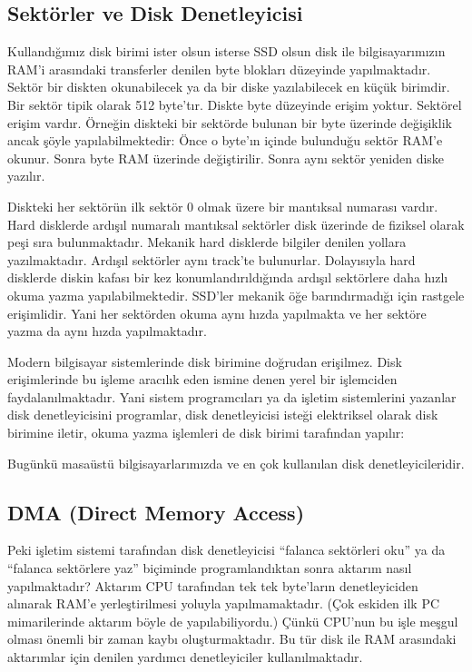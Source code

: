 \documentclass[a4paper,10pt,turkish]{sphinxmanual}
\begin{document}
\subsection{Sektörler ve Disk Denetleyicisi}
\label{\detokenize{filesystem1:sektorler-ve-disk-denetleyicisi}}
\sphinxAtStartPar
Kullandığımız disk birimi ister  olsun isterse SSD olsun disk ile bilgisayarımızın
RAM’i arasındaki transferler  denilen byte blokları düzeyinde yapılmaktadır. Sektör
bir diskten okunabilecek ya da bir diske yazılabilecek en küçük birimdir. Bir sektör tipik olarak
512 byte’tır. Diskte byte düzeyinde erişim yoktur. Sektörel erişim vardır. Örneğin diskteki bir
sektörde bulunan bir byte üzerinde değişiklik ancak şöyle yapılabilmektedir: Önce o byte’ın
içinde bulunduğu sektör RAM’e okunur. Sonra byte RAM üzerinde değiştirilir. Sonra aynı sektör
yeniden diske yazılır.

\sphinxAtStartPar
Diskteki her sektörün ilk sektör 0 olmak üzere bir mantıksal numarası vardır. Hard disklerde
ardışıl numaralı mantıksal sektörler disk üzerinde de fiziksel olarak peşi sıra bulunmaktadır.
Mekanik hard disklerde bilgiler  denilen yollara yazılmaktadır. Ardışıl sektörler aynı
track’te bulunurlar. Dolayısıyla hard disklerde diskin kafası bir kez konumlandırıldığında
ardışıl sektörlere daha hızlı okuma yazma yapılabilmektedir. SSD’ler mekanik öğe barındırmadığı
için rastgele erişimlidir. Yani her sektörden okuma aynı hızda yapılmakta ve her sektöre yazma da
aynı hızda yapılmaktadır.

\sphinxAtStartPar
Modern bilgisayar sistemlerinde disk birimine doğrudan erişilmez. Disk erişimlerinde bu işleme
aracılık eden ismine  denen yerel bir işlemciden
faydalanılmaktadır. Yani sistem programcıları ya da işletim sistemlerini yazanlar disk
denetleyicisini programlar, disk denetleyicisi isteği elektriksel olarak disk birimine iletir,
okuma yazma işlemleri de disk birimi tarafından yapılır:


\sphinxAtStartPar
Bugünkü masaüstü bilgisayarlarımızda  ve  en çok kullanılan disk denetleyicileridir.


\subsection{DMA (Direct Memory Access)}
\label{\detokenize{filesystem1:dma-direct-memory-access}}
\sphinxAtStartPar
Peki işletim sistemi tarafından disk denetleyicisi “falanca sektörleri oku” ya da “falanca
sektörlere yaz” biçiminde  programlandıktan sonra aktarım nasıl yapılmaktadır?  Aktarım CPU
tarafından tek tek byte’ların denetleyiciden alınarak RAM’e yerleştirilmesi yoluyla
yapılmamaktadır. (Çok eskiden ilk PC mimarilerinde aktarım böyle de yapılabiliyordu.) Çünkü
CPU’nun bu işle meşgul olması önemli bir zaman kaybı oluşturmaktadır. Bu tür disk ile RAM
arasındaki aktarımlar için  denilen yardımcı denetleyiciler
kullanılmaktadır.
\end{document}
